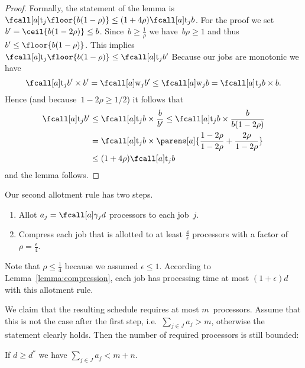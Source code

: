 \begin{proof}
  Formally, the statement of the lemma is
  $\ptm{j}{\floor{b(1-\rho)}} \leq (1 + 4\rho) \ptm{j}{b}$.
  For the proof we
  set~$b' = \ceil{b(1-2\rho)} \leq b$.
  Since~$b \geq \frac{1}{\rho}$ we have~$b\rho \geq 1$
  and thus~$b' \leq \floor{b(1-\rho)}$.
  This implies~$\ptm{j}{\floor{b(1-\rho)}} \leq \ptm{j}{b'}$
  Because our jobs are monotonic we have
  \begin{equation}
    \ptm{j}{b'} \times b' = \work{j}{b'} \leq \work{j}{b} = \ptm{j}{b} \times b \dpunct{.}
  \end{equation}
  Hence (and because~$1-2\rho \geq 1/2$) it follows that
  \begin{equation}
    \begin{aligned}
      \ptm{j}{b'} &\leq \ptm{j}{b} \times \frac{b}{b'} \leq \ptm{j}{b} \times \frac{b}{b(1-2\rho)} \\
      &= \ptm{j}{b} \times \parens[a]{\frac{1 - 2\rho}{1 - 2\rho} + \frac{2\rho}{1-2\rho}}  \\
      &\leq (1 + 4\rho) \ptm{j}{b}
    \end{aligned}
  \end{equation}
  and the lemma follows.
\end{proof}

Our second allotment rule has two steps.
\begin{enumerate}
  \item Allot $a_j = \procnum{j}{d}$ processors to each job~$j$.
  \item Compress each job that is allotted to at least $\frac{4}{\epsilon}$ processors
    with a factor of $\rho = \frac{\epsilon}{4}$.
\end{enumerate}
Note that $\rho \leq \frac{1}{4}$ because we assumed $\epsilon \leq 1$.
According to Lemma~\ref{lemma:compression},
each job has processing time at most $(1 + \epsilon) d$ with this allotment rule.

We claim that the resulting schedule requires at most $m$~processors.
Assume that this is not the case after the first step, i.e.~$\sum_{j \in J} a_j > m$,
otherwise the statement clearly holds.
Then the number of required processors is still bounded:

\begin{lemma}
  \label{lemma:first-step}
  If $d \geq d^*$ we have $\sum_{j \in J} a_j < m + n$.
\end{lemma}

